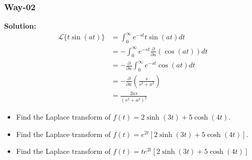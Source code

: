 \documentclass[11pt]{beamer}
\theoremstyle{plain}
\begin{document}
\begin{frame}
    \frametitle{Way-02}
    \textbf{Solution:}
    \begin{align*}
        \mathcal L\{t\sin(at)\} &= \int_0^\infty e^{-st}t\sin(at)dt \\
        &= -\int_0^\infty e^{-st} \frac{\partial}{\partial a} \left( \cos(at) \right) dt\\
        &= - \frac{\partial}{\partial a} \int_0^\infty e^{-st} \cos(at) dt \\
        &= - \frac{\partial}{\partial a} \left( \frac{s}{s^2 + a^2} \right) \\
        &= \frac{2as}{(s^2 + a^2)^2}
    \end{align*}
\end{frame}

\begin{frame}
    \begin{example}
        \begin{itemize}
            \item Find the Laplace transform of $f(t)=2\sinh(3t)+5\cosh(4t)$.
            \item Find the Laplace transform of $f(t)=e^{2t}[2\sinh(3t)+5\cosh(4t)]$.
            \item Find the Laplace transform of $f(t)=t e^{2t}[2\sinh(3t)+5\cosh(4t)]$
        \end{itemize}
    \end{example}
\end{frame}
\end{document}
